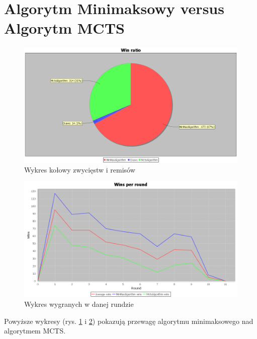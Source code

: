 \section{Algorytm Minimaksowy versus Algorytm MCTS}

\begin{figure}[H]
	\centering
	\includegraphics[width=\textwidth]{Resources/MirrorMmVsMcts/MmVsMctsWin.PNG}
	\caption{Wykres kołowy zwycięstw i remisów} 
	\label{fig:MmVsMctsWin}
\end{figure}

\begin{figure}[H]
	\centering
	\includegraphics[width=\textwidth]{Resources/MirrorMmVsMcts/MmVsMctsRoundWin.PNG}
	\caption{Wykres wygranych w danej rundzie} 
	\label{fig:MmVsMctsRoundWin}
\end{figure}

Powyższe wykresy (rys. \ref{fig:MmVsMctsWin} i \ref{fig:MmVsMctsRoundWin}) pokazują przewagę algorytmu minimaksowego nad algorytmem MCTS.

